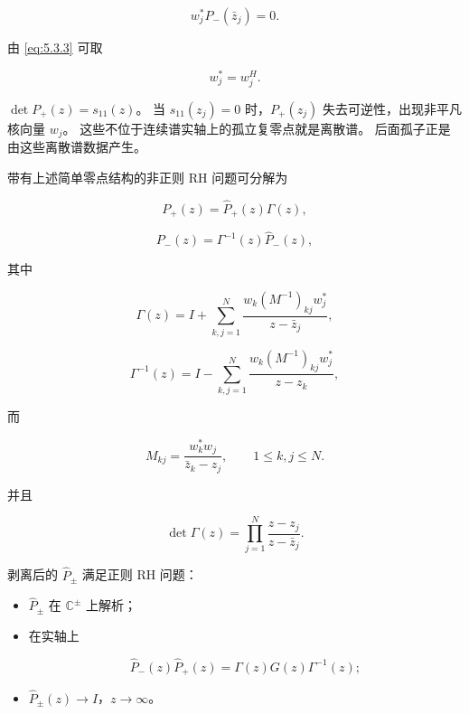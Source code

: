 \documentclass[
    lang=cn,
    scheme=chinese,
    mode=simple,
    device=normal,
    color=blue,
    math=cm,
    thmcnt=section,
    12pt
]{elegantbook}
\begin{document}
\begin{equation}
    w_j^*P_-(\bar z_j)=0.
    \tag{5.3.12}
    \label{eq:5.3.12}
\end{equation}

由 \eqref{eq:5.3.3} 可取

\begin{equation}
    w_j^*=w_j^H.
    \tag{5.3.13}
    \label{eq:5.3.13}
\end{equation}

\begin{callout}
    $\det P_+(z)=s_{11}(z)$。
    当 $s_{11}(z_j)=0$ 时，$P_+(z_j)$ 失去可逆性，出现非平凡核向量 $w_j$。
    这些不位于连续谱实轴上的孤立复零点就是离散谱。
    后面孤子正是由这些离散谱数据产生。
\end{callout}

\setcounter{theorem}{2}
\begin{theorem}
带有上述简单零点结构的非正则 RH 问题可分解为

\begin{equation}
    P_+(z)
    =
    \widehat P_+(z)\Gamma(z),
    \tag{5.3.14}
    \label{eq:5.3.14}
\end{equation}

\begin{equation}
    P_-(z)
    =
    \Gamma^{-1}(z)\widehat P_-(z),
    \tag{5.3.15}
    \label{eq:5.3.15}
\end{equation}

其中

\begin{equation}
    \Gamma(z)
    =
    I+
    \sum\limits_{k,j=1}^{N}
    \dfrac{
        w_k(M^{-1})_{kj}w_j^*
    }{
        z-\bar z_j
    },
    \tag{5.3.16}
    \label{eq:5.3.16}
\end{equation}

\begin{equation}
    \Gamma^{-1}(z)
    =
    I-
    \sum\limits_{k,j=1}^{N}
    \dfrac{
        w_k(M^{-1})_{kj}w_j^*
    }{
        z-z_k
    },
    \tag{5.3.17}
    \label{eq:5.3.17}
\end{equation}

而

\[
    M_{kj}
    =
    \dfrac{w_k^*w_j}{\bar z_k-z_j},
    \qquad
    1\le k,j\le N.
\]

并且

\[
    \det\Gamma(z)
    =
    \prod\limits_{j=1}^{N}
    \dfrac{z-z_j}{z-\bar z_j}.
\]

剥离后的 $\widehat P_\pm$ 满足正则 RH 问题：

\begin{itemize}
    \item $\widehat P_\pm$ 在 $\mathbb{C}^\pm$ 上解析；
    \item 在实轴上

          \[
              \widehat P_-(z)\widehat P_+(z)
              =
              \Gamma(z)G(z)\Gamma^{-1}(z);
          \]

    \item $\widehat P_\pm(z)\to I$，$z\to\infty$。
\end{itemize}

\end{theorem}
\end{document}
